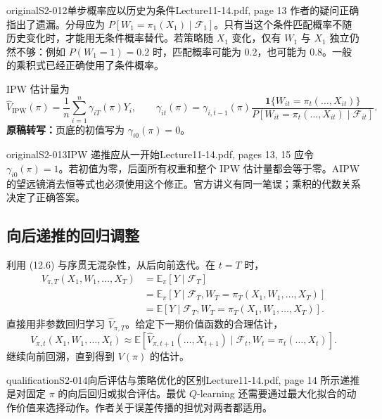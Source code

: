 \begin{reviewnote}{original}{S2-012}{单步概率应以历史为条件}{Lecture11-14.pdf, page 13}
作者的疑问正确指出了遗漏。分母应为 $P[W_1=\pi_1(X_1)\mid\mathcal F_1]$。只有当这个条件匹配概率不随历史变化时，才能用无条件概率替代。若策略随 $X_1$ 变化，仅有 $W_1$ 与 $X_1$ 独立仍然不够：例如 $P(W_1=1)=0.2$ 时，匹配概率可能为 $0.2$，也可能为 $0.8$。一般的乘积式已经正确使用了条件概率。
\end{reviewnote}


IPW 估计量为
\[
 \widehat V_{\mathrm{IPW}}(\pi)=\frac1n\sum_{i=1}^n\gamma_{iT}(\pi)Y_i,
 \qquad
 \gamma_{it}(\pi)=\gamma_{i,t-1}(\pi)
 \frac{\mathbf1\{W_{it}=\pi_t(\ldots,X_{it})\}}
 {P[W_{it}=\pi_t(\ldots,X_{it})\mid\mathcal F_{it}]}.
\]
\textbf{原稿转写：}页底的初值写为 $\gamma_{i0}(\pi)=0$。

\begin{reviewnote}{original}{S2-013}{IPW 递推应从一开始}{Lecture11-14.pdf, pages 13, 15}
应令 $\gamma_{i0}(\pi)=1$。若初值为零，后面所有权重和整个 IPW 估计量都会等于零。AIPW 的望远镜消去恒等式也必须使用这个修正。官方讲义有同一笔误；乘积的代数关系决定了正确答案。
\end{reviewnote}



\subsection{向后递推的回归调整}
利用 (12.6) 与序贯无混杂性，从后向前迭代。在 $t=T$ 时，
\begin{align*}
 V_{\pi,T}(X_1,W_1,\ldots,X_T)
 &=\mathbb E_\pi[Y\mid\mathcal F_T]\\
 &=\mathbb E_\pi[Y\mid\mathcal F_T,W_T=\pi_T(X_1,W_1,\ldots,X_T)]\\
 &=\mathbb E[Y\mid\mathcal F_T,W_T=\pi_T(X_1,W_1,\ldots,X_T)].
\end{align*}
直接用非参数回归学习 $\widehat V_{\pi,T}$。给定下一期价值函数的合理估计，
\[
 V_{\pi,t}(X_1,W_1,\ldots,X_t)
 \approx\mathbb E[\widehat V_{\pi,t+1}(\ldots,X_{t+1})
 \mid\mathcal F_t,W_t=\pi_t(\ldots,X_t)].\tag{12.12}
\]
继续向前回溯，直到得到 $V(\pi)$ 的估计。

\begin{reviewnote}{qualification}{S2-014}{向后评估与策略优化的区别}{Lecture11-14.pdf, page 14}
所示递推是对固定 $\pi$ 的向后回归或拟合评估。最优 $Q$-learning 还需要通过最大化拟合的动作价值来选择动作。作者关于误差传播的担忧对两者都适用。
\end{reviewnote}


